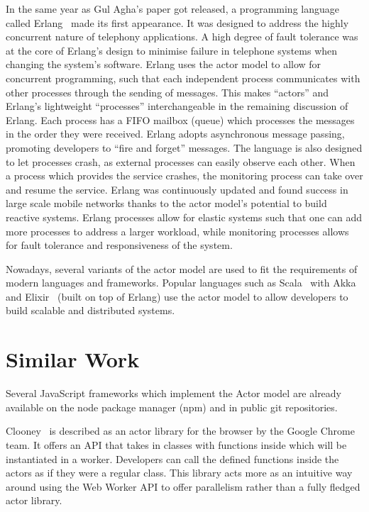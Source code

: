 \documentclass[12pt, a4paper]{report}
\theoremstyle{definition}
\theoremstyle{definition}%
\theoremstyle{definition}%
\theoremstyle{definition}%
\theoremstyle{definition}%
\theoremstyle{definition}%
\begin{document}
In the same year as Gul Agha’s paper got released, a programming language called Erlang~\cite{erlang} made its first appearance. It was designed to address the highly concurrent nature of telephony applications. A high degree of fault tolerance was at the core of Erlang’s design to minimise failure in telephone systems when changing the system’s software. Erlang uses the actor model to allow for concurrent programming, such that each independent process communicates with other processes through the sending of messages. This makes “actors” and Erlang’s lightweight “processes” interchangeable in the remaining discussion of Erlang. Each process has a FIFO mailbox (queue) which processes the messages in the order they were received. Erlang adopts asynchronous message passing, promoting developers to “fire and forget” messages. The language is also designed to let processes crash, as external processes can easily observe each other. When a process which provides the service crashes, the monitoring process can take over and resume the service. Erlang was continuously updated and found success in large scale mobile networks thanks to the actor model’s potential to build reactive systems\cite{reactivemanifesto}. Erlang processes allow for elastic systems such that one can add more processes to address a larger workload, while monitoring processes allows for fault tolerance and responsiveness of the system. 

Nowadays, several variants of the actor model are used to fit the requirements of modern languages and frameworks. Popular languages such as Scala~\cite{scala} with Akka~\cite{akka} and Elixir~\cite{elixir} (built on top of Erlang) use the actor model to allow developers to build scalable and distributed systems.

\section{Similar Work}
Several JavaScript frameworks which implement the Actor model are already available on the node package manager (npm) and in public git repositories.

Clooney~\cite{clooney} is described as an actor library for the browser by the Google Chrome team. It offers an API that takes in classes with functions inside which will be instantiated in a worker. Developers can call the defined functions inside the actors as if they were a regular class. This library acts more as an intuitive way around using the Web Worker API to offer parallelism rather than a fully fledged actor library. 
\end{document}
